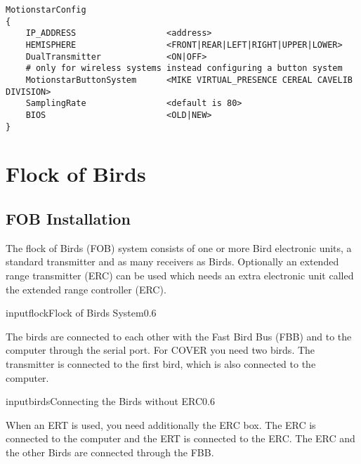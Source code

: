 \small \begin{verbatim}
MotionstarConfig
{
    IP_ADDRESS                  <address>
    HEMISPHERE                  <FRONT|REAR|LEFT|RIGHT|UPPER|LOWER>
    DualTransmitter             <ON|OFF>
    # only for wireless systems instead configuring a button system
    MotionstarButtonSystem      <MIKE VIRTUAL_PRESENCE CEREAL CAVELIB DIVISION>
    SamplingRate                <default is 80>
    BIOS                        <OLD|NEW>
}
\end{verbatim} \normalsize

%
%

\newpage


\section{Flock of Birds}

\subsection{FOB Installation}
The flock of Birds (FOB) system consists of one or more Bird electronic units,
a standard transmitter and as many receivers as Birds. Optionally an extended range
transmitter (ERC) can be used which needs an extra electronic unit called the
extended range controller (ERC).

\begin{covimg}{input}{flock}{Flock of Birds System}{0.6}\end{covimg}

The birds are connected to each other with the Fast Bird Bus (FBB) and to
the computer through the serial port.
For COVER you need two birds. The transmitter is connected to the first bird, 
which is also connected to the computer.

\begin{covimg}{input}{birds}{Connecting the Birds without ERC}{0.6}\end{covimg}

When an ERT is
used, you need additionally the ERC box. 
The ERC is connected to the computer and the ERT is connected to
the ERC. The ERC and the other Birds are connected through the FBB.

